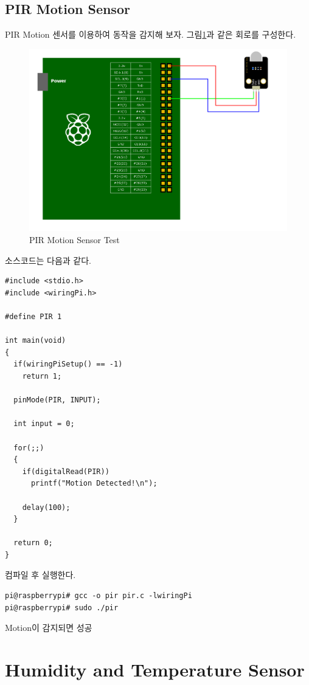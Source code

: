 \documentclass[11pt
  , a4paper
  , article
  , oneside
]{memoir}
\begin{document}
\subsection{PIR Motion Sensor}
PIR Motion 센서를 이용하여 동작을 감지해 보자. 그림\ref{fig:pir_test}과 같은 회로를 구성한다.
\begin{figure}[!htb]
\centering
\includegraphics[width=1\textwidth]{./images/raspberry/pir_test.png}
\caption{PIR Motion Sensor Test}
\label{fig:pir_test}
\end{figure}
소스코드는 다음과 같다.
\begin{lstlisting}[style=termstylenumber, caption={pri.c}, label={list:priTestCode}]
#include <stdio.h>
#include <wiringPi.h>

#define PIR 1

int main(void)
{
  if(wiringPiSetup() == -1)
    return 1;

  pinMode(PIR, INPUT);

  int input = 0;

  for(;;)
  {
    if(digitalRead(PIR))
      printf("Motion Detected!\n");

    delay(100);
  }

  return 0;
}
\end{lstlisting}
컴파일 후 실행한다.
\begin{lstlisting}[style=termstyle]
pi@raspberrypi# gcc -o pir pir.c -lwiringPi
pi@raspberrypi# sudo ./pir
\end{lstlisting}
Motion이 감지되면 성공
\section{Humidity and Temperature Sensor}
\end{document}
